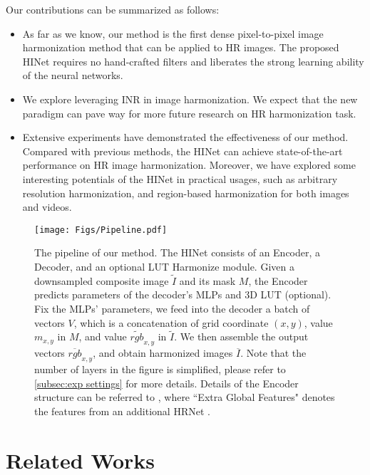 \documentclass[10pt,journal,twocolumn,twoside]{IEEEtran}
\begin{document}
Our contributions can be summarized as follows:

\begin{itemize}
    \item As far as we know, our method is the first dense pixel-to-pixel image harmonization method that can be applied to HR images. The proposed HINet requires no hand-crafted filters and liberates the strong learning ability of the neural networks.
    \item We explore leveraging INR in image harmonization. We expect that the new paradigm can pave way for more future research on HR harmonization task.
    \item Extensive experiments have demonstrated the effectiveness of our method. Compared with previous methods, the HINet can achieve state-of-the-art performance on HR image harmonization. Moreover, we have explored some interesting potentials of the HINet in practical usages, such as arbitrary resolution harmonization, and region-based harmonization for both images and videos.
\end{itemize}

\begin{figure*}[t]
  \centering
   \texttt{[image: Figs/Pipeline.pdf]}
   \vspace{-3ex}
   \caption{The pipeline of our method. The HINet consists of an Encoder, a Decoder, and an optional LUT Harmonize module. Given a downsampled composite image $\widetilde{I}$ and its mask $M$, the Encoder predicts parameters of the decoder's MLPs and 3D LUT (optional). Fix the MLPs' parameters, we feed into the decoder a batch of vectors $V$, which is a concatenation of grid coordinate $(x, y)$, value $m_{x, y}$ in $M$, and value $\widetilde{rgb}_{x, y}$ in $\widetilde{I}$. We then assemble the output vectors $\overline{rgb}_{x, y}$, and obtain harmonized images $\overline{I}$. Note that the number of layers in the figure is simplified, please refer to \cref{subsec:exp settings} for more details. Details of the Encoder structure can be referred to \cite{sofiiuk2021foreground}, where ``Extra Global Features" denotes the features from an additional HRNet \cite{wang2020deep}.}
   \label{fig:Pipeline}
\end{figure*}


\section{Related Works}
\label{sec:relate}
\end{document}
